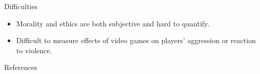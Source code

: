 \documentclass{beamer}
\begin{document}
\begin{frame}{Difficulties}
	\begin{itemize}
		\item Morality and ethics are both subjective and hard to quantify. 
		\item Difficult to measure effects of video games on players' aggression or reaction to violence. 
	\end{itemize}
\end{frame}

\begin{frame}[allowframebreaks]{References}
	
	
\end{frame}
\end{document}
